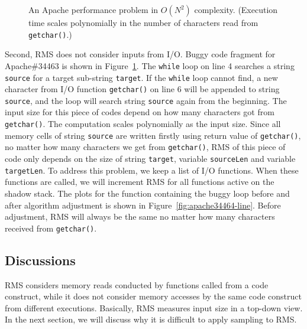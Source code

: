 {{{{\begin{figure}
\centering
{}
  \mbox{}
\caption{An Apache performance problem in $O(N^2)$ complexity. 
(Execution time scales polynomially in the number of characters read from  \texttt{getchar()}.) }
\vspace{-0.05in}
\label{fig:apache34464}
\vspace{-0.05in}
\end{figure}

Second, RMS does not consider inputs from I/O.
Buggy code fragment for Apache\#34463 is shown 
in Figure~\ref{fig:apache34464}.
The \texttt{while} loop on line 4 searches a string \texttt{source} for a target sub-string \texttt{target}.
If the \texttt{while} loop cannot find, 
a new character from I/O function \texttt{getchar()} 
on line 6 will be appended to string \texttt{source}, 
and the loop will search string \texttt{source} again from the beginning. 
The input size for this piece of codes depend on how many 
characters got from \texttt{getchar()}.
The computation scales polynomially as the input size.
Since all memory cells of string \texttt{source} are written 
firstly using return value of \texttt{getchar()}, 
no matter how many characters we get from \texttt{getchar()}, 
RMS of this piece of code only depends 
on the size of string \texttt{target}, 
variable \texttt{sourceLen} and variable \texttt{targetLen}.
To address this problem, 
we keep a list of I/O functions. 
When these functions are called, 
we will increment RMS for all 
functions active on the shadow stack. 
The plots for the function containing the buggy loop 
before and after algorithm adjustment is shown in Figure~\ref{fig:apache34464-line}.
Before adjustment, 
RMS will always be the same no 
matter how many characters received from \texttt{getchar()}. 


\subsection{Discussions}

RMS considers memory reads conducted by functions called from a code construct,
while it does not consider memory accesses 
by the same code construct from different executions.
Basically, RMS measures input size in a top-down view.
In the next section, we will discuss why it is difficult to apply sampling to RMS.

}}}}
